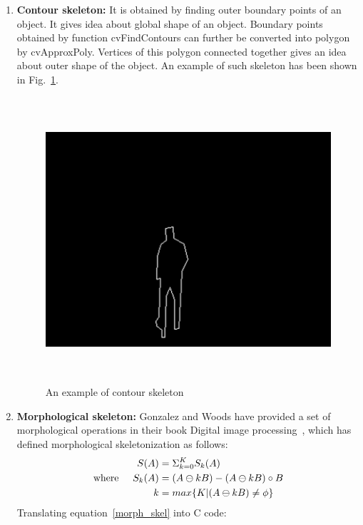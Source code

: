 \begin{enumerate}
\item \textbf{Contour skeleton:} It is obtained by finding outer
boundary points of an object. It gives idea about global shape of an
object. Boundary points obtained by function cvFindContours can further
be converted into polygon by cvApproxPoly. Vertices of this polygon
connected together gives an idea about outer shape of the object. An
example of such skeleton has been shown in Fig.~\ref{contour_skeleton}.
\begin{figure}[!b]
\centering
\includegraphics[height=300pt]{Figures/contour_skeleton}
\caption{An example of contour skeleton}
\label{contour_skeleton}
\end{figure}
\item \textbf{Morphological skeleton:} Gonzalez and Woods have provided a
	set of morphological operations in their book Digital image
	processing~\cite{35}, which has defined morphological
	skeletonization as follows:
	\begin{equation}
	\begin{aligned}
		S(A) &= \Sigma ^K _{k = 0} S_k(A) \nonumber \label{morph_skel}\\
	\mathrm{where} \hspace{5 mm} S_k(A) &= (A \ominus kB) - (A \ominus kB) \circ B \nonumber\\
			  k &= max \{ K | (A \ominus kB) \neq \phi\}
	\end{aligned}
	\end{equation}
Translating equation~\ref{morph_skel} into C code:
\begin{lstlisting}


\end{lstlisting}
\end{enumerate}
